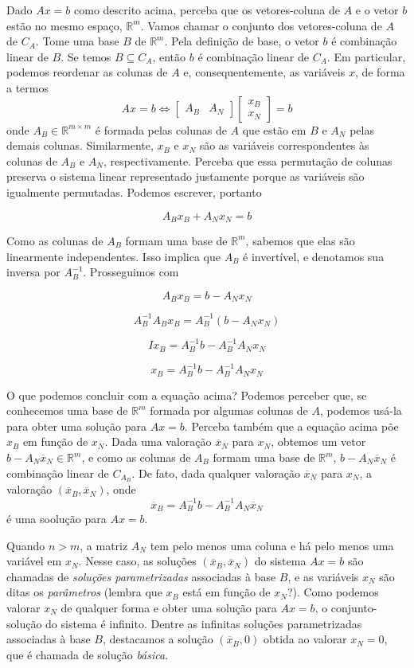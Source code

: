 \documentclass[]{article}
\numberwithin{equation}{section}
\begin{document}
Dado $Ax = b$ como descrito acima, perceba que os vetores-coluna de $A$ e o vetor $b$ estão no mesmo espaço, $\mathbb{R}^m$. Vamos chamar o conjunto dos vetores-coluna de $A$ de $C_A$. Tome uma base $B$ de $\mathbb{R}^m$. Pela definição de base, o vetor $b$ é combinação linear de $B$. Se temos $B \subseteq C_A$, então $b$ é combinação linear de $C_A$. Em particular, podemos reordenar as colunas de $A$ e, consequentemente, as variáveis $x$, de forma a termos
$$
Ax = b \iff
\begin{bmatrix}
A_B & A_N
\end{bmatrix}
\begin{bmatrix}
x_B \\
x_N
\end{bmatrix}
= b
$$
onde $A_B \in \mathbb{R}^{m \times m}$ é formada pelas colunas de $A$ que estão em $B$ e $A_N$ pelas demais colunas. Similarmente, $x_B$ e $x_N$ são as variáveis correspondentes às colunas de $A_B$ e $A_N$, respectivamente. Perceba que essa permutação de colunas preserva o sistema linear representado justamente porque as variáveis são igualmente permutadas. Podemos escrever, portanto

$$
A_B x_B + A_N x_N = b
$$

Como as colunas de $A_B$ formam uma base de $\mathbb{R}^m$, sabemos que elas são linearmente independentes. Isso implica que $A_B$ é invertível, e denotamos sua inversa por $A_B^{-1}$. Prosseguimos com

$$
A_B x_B = b - A_N x_N
$$

$$
A_B^{-1} A_B x_B = A_B^{-1} (b - A_N x_N)
$$

$$
I x_B = A_B^{-1} b - A_B^{-1} A_N x_N
$$

$$
x_B = A_B^{-1} b - A_B^{-1} A_N x_N
$$

O que podemos concluir com a equação acima? Podemos perceber que, se conhecemos uma base de $\mathbb{R}^m$ formada por algumas colunas de $A$, podemos usá-la para obter uma solução para $Ax = b$. Perceba também que a equação acima põe $x_B$ em função de $x_N$. Dada uma valoração $\overline{x}_N$ para $x_N$, obtemos um vetor $b - A_N \overline{x}_N \in \mathbb{R}^m$, e como as colunas de $A_B$ formam uma base de $\mathbb{R}^m$, $b - A_N \overline{x}_N$ é combinação linear de $C_{A_B}$. De fato, dada qualquer valoração $\overline{x}_N$ para $x_N$, a valoração $(\overline{x}_B, \overline{x}_N)$, onde
$$
\overline{x}_B = A_B^{-1} b - A_B^{-1} A_N \overline{x}_N
$$
é uma soolução para $Ax = b$.

Quando $n > m$, a matriz $A_N$ tem pelo menos uma coluna e há pelo menos uma variável em $x_N$. Nesse caso, as soluções  $(\overline{x}_B, \overline{x}_N)$ do sistema $Ax = b$ são chamadas de \emph{soluções parametrizadas} associadas à base $B$, e as variáveis $x_N$ são ditas os \emph{parâmetros} (lembra que $x_B$ está em função de $x_N$?). Como podemos valorar $x_N$ de qualquer forma e obter uma solução para $Ax = b$, o conjunto-solução do sistema é infinito. Dentre as infinitas soluções parametrizadas associadas à base $B$, destacamos a solução $(\overline{x}_B, 0)$ obtida ao valorar $x_N = 0$, que é chamada de solução \emph{básica}.
\end{document}
